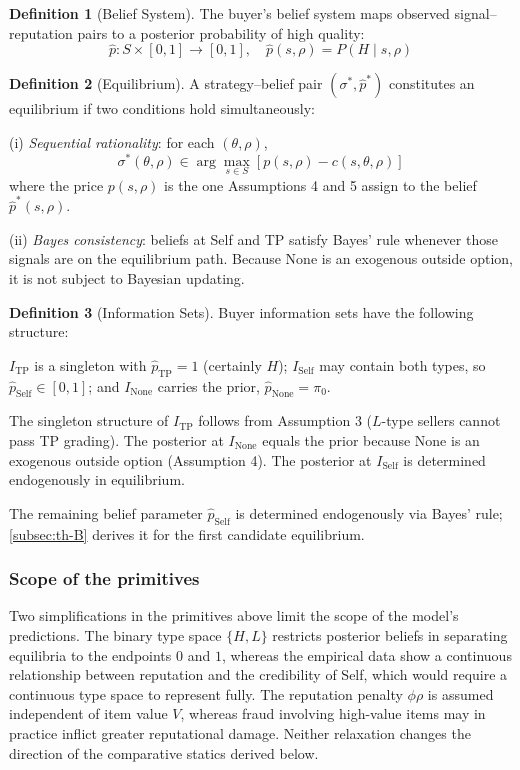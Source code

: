 \documentclass[11pt,letterpaper]{article}
\theoremstyle{definition}
\newtheorem{definition}{Definition}[section]
\begin{document}
\begin{definition}[Belief System]
The buyer's belief system maps observed signal--reputation pairs to a posterior probability of high quality:
\[\hat{p}: S \times [0, 1] \to [0, 1], \quad \hat{p}(s, \rho) = P(H \mid s, \rho)\]
\end{definition}

\begin{definition}[Equilibrium]
A strategy--belief pair $(\sigma^*, \hat{p}^*)$ constitutes an equilibrium if two conditions hold simultaneously:

(i) \textit{Sequential rationality}: for each $(\theta, \rho)$,
\[\sigma^*(\theta, \rho) \in \arg\max_{s \in S} \left[ p(s, \rho) - c(s, \theta, \rho) \right]\]
where the price $p(s, \rho)$ is the one Assumptions 4 and 5 assign to the belief $\hat{p}^*(s, \rho)$.

(ii) \textit{Bayes consistency}: beliefs at Self and TP satisfy Bayes' rule whenever those signals are on the equilibrium path. Because None is an exogenous outside option, it is not subject to Bayesian updating.
\end{definition}

\begin{definition}[Information Sets]
Buyer information sets have the following structure:

$I_{\text{TP}}$ is a singleton with $\hat{p}_{\text{TP}} = 1$ (certainly $H$); $I_{\text{Self}}$ may contain both types, so $\hat{p}_{\text{Self}} \in [0, 1]$; and $I_{\text{None}}$ carries the prior, $\hat{p}_{\text{None}} = \pi_0$.

The singleton structure of $I_{\text{TP}}$ follows from Assumption 3 ($L$-type sellers cannot pass TP grading). The posterior at $I_{\text{None}}$ equals the prior because None is an exogenous outside option (Assumption 4). The posterior at $I_{\text{Self}}$ is determined endogenously in equilibrium.
\end{definition}

The remaining belief parameter $\hat{p}_{\text{Self}}$ is determined endogenously via Bayes' rule; \ref{subsec:th-B} derives it for the first candidate equilibrium.

\subsubsection*{Scope of the primitives}

Two simplifications in the primitives above limit the scope of the model's predictions. The binary type space $\{H, L\}$ restricts posterior beliefs in separating equilibria to the endpoints $0$ and $1$, whereas the empirical data show a continuous relationship between reputation and the credibility of Self, which would require a continuous type space to represent fully. The reputation penalty $\phi\rho$ is assumed independent of item value $V$, whereas fraud involving high-value items may in practice inflict greater reputational damage. Neither relaxation changes the direction of the comparative statics derived below.
\end{document}
